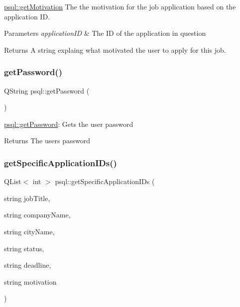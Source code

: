 \hyperlink{classpsql_aca1b2273937491e113089c1547caf49b}{psql\+::get\+Motivation} The the motivation for the job application based on the application ID. 


\begin{DoxyParams}{Parameters}
{\em application\+ID} & The ID of the application in question \\
\hline
\end{DoxyParams}
\begin{DoxyReturn}{Returns}
A string explaing what motivated the user to apply for this job. 
\end{DoxyReturn}
\mbox{\label{classpsql_a817e5a88f877cac6f843c1e743aec096}} 
\subsubsection{\texorpdfstring{get\+Password()}{getPassword()}}
{\footnotesize\ttfamily Q\+String psql\+::get\+Password (\begin{DoxyParamCaption}{ }\end{DoxyParamCaption})}



\hyperlink{classpsql_a817e5a88f877cac6f843c1e743aec096}{psql\+::get\+Password}\+: Gets the user password 

\begin{DoxyReturn}{Returns}
The user\textquotesingle{}s password 
\end{DoxyReturn}
\mbox{\label{classpsql_ab6edb8a2e42d8ac7c4ae29f5b0cb494f}} 
\subsubsection{\texorpdfstring{get\+Specific\+Application\+I\+Ds()}{getSpecificApplicationIDs()}}
{\footnotesize\ttfamily Q\+List$<$ int $>$ psql\+::get\+Specific\+Application\+I\+Ds (\begin{DoxyParamCaption}\item[{string}]{job\+Title,  }\item[{string}]{company\+Name,  }\item[{string}]{city\+Name,  }\item[{string}]{status,  }\item[{string}]{deadline,  }\item[{string}]{motivation }\end{DoxyParamCaption})}



